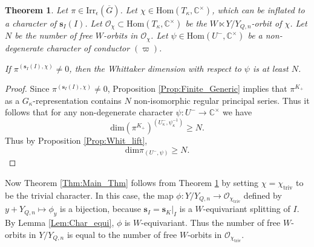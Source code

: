 \documentclass[11pt]{amsart}
\theoremstyle{plain}
\newtheorem{Thm}[equation]{Theorem}
\theoremstyle{definition}
\numberwithin{equation}{section}
\newcommand{\C}{\mathbb{C}}
\newcommand{\Gt}{\overline{G}}
\newcommand{\It}{\overline{I}}
\newcommand{\Yt}{Y_{Q,n}}
\newcommand{\s}{\mathbf{s}}
\newcommand{\Ocal}{\mathcal{O}}
\begin{document}
\begin{Thm}\label{Thm:generalized_main}
    Let $\pi\in \mathrm{Irr}_{\epsilon}(\Gt)$. Let $\chi\in\mathrm{Hom}(T_{\kappa},\C^{\times})$, which can be inflated to a character of $\s_{I}(I)$. Let $\Ocal_{\chi}\subset \mathrm{Hom}(T_{\kappa},\C^{\times})$ be the $W\ltimes Y/\Yt$-orbit of $\chi$. Let $N$ be the number of free $W$-orbits in $\mathcal{O}_{\chi}$. Let $\psi\in \mathrm{Hom}(U^{-},\C^{\times})$ be a non-degenerate character of conductor $(\varpi)$.

    If $\pi^{(\s_{I}(I),\chi)}\neq 0$, then the Whittaker dimension with respect to $\psi$ is at least $N$. 
\end{Thm}

\begin{proof}
    Since $\pi^{(\s_{I}(I),\chi)}\neq 0$, Proposition \ref{Prop:Finite_Generic} implies that $\pi^{K_{+}}$ as a $G_{\kappa}$-representation contains $N$ non-isomorphic regular principal series. Thus it follows that for any non-degenerate character $\psi:U^{-}\rightarrow \C^{\times}$ we have 
    \begin{equation*}
        \mathrm{dim}(\pi^{K_{+}})^{(U^{-}_{\kappa},\psi_{\kappa}^{-1})}\geq N.
    \end{equation*}
    Thus by Proposition \ref{Prop:Whit_lift},
    \begin{equation*}
        \mathrm{dim}\pi_{(U^{-},\psi)}\geq N.
    \end{equation*}
\end{proof}

Now Theorem \ref{Thm:Main_Thm} follows from Theorem \ref{Thm:generalized_main} by setting $\chi=\chi_{\mathrm{triv}}$ to be the trivial character. In this case, the map $\phi: Y/\Yt\rightarrow \Ocal_{\chi_{\mathrm{triv}}}$ defined by $y+\Yt\mapsto \phi_{y}$ is a bijection, because $\s_{I} = \s_{K}|_{I}$ is a $W$-equivariant splitting of $I$. By Lemma \ref{Lem:Char_equi}, $\phi$ is $W$-equivariant. Thus the number of free $W$-orbits in $Y/\Yt$ is equal to the number of free $W$-orbits in $\Ocal_{\chi_{\mathrm{triv}}}$.


\end{document}
